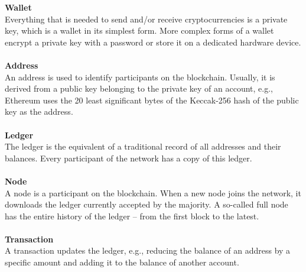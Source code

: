 \textbf{Wallet}\\
Everything that is needed to send and/or receive cryptocurrencies is a private key\cite{bitcoin-whitepaper}, which is a wallet in its simplest form.
More complex forms of a wallet encrypt a private key with a password or store it on a dedicated hardware device.
\\\\

\textbf{Address}\\
An address is used to identify participants on the blockchain.
Usually, it is derived from a public key belonging to the private key of an account, e.g., Ethereum uses the 20 least significant bytes of the Keccak-256 hash of the public key as the address\cite{ethereum-yellow-paper}.
\\\\

\textbf{Ledger}\\
The ledger is the equivalent of a traditional record of all addresses and their balances.
Every participant of the network has a copy of this ledger.
\\\\

\textbf{Node}\\
A node is a participant on the blockchain.
When a new node joins the network, it downloads the ledger currently accepted by the majority.
A so-called full node has the entire history of the ledger – from the first block to the latest.
\\\\

\textbf{Transaction}\\
A transaction updates the ledger, e.g., reducing the balance of an address by a specific amount and adding it to the balance of another account.
\\\\

